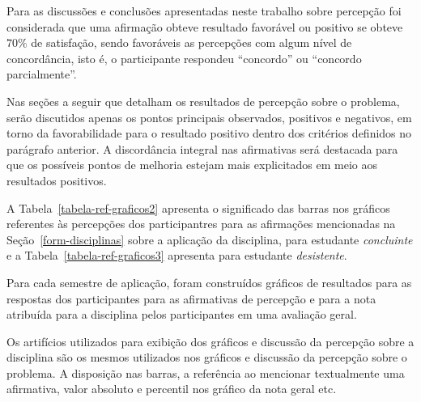 Para as discussões e conclusões apresentadas neste trabalho
sobre percepção foi considerada que uma afirmação obteve
resultado favorável ou positivo
se obteve $70\%$ de satisfação,
sendo favoráveis as percepções com algum nível de concordância,
isto é, o participante respondeu ``concordo''
ou ``concordo parcialmente''.


Nas seções a seguir que detalham os resultados de percepção sobre o problema, 
serão discutidos apenas os pontos principais observados,
positivos e negativos, em torno da favorabilidade para o
resultado positivo dentro dos critérios
definidos no parágrafo anterior.
A discordância integral nas afirmativas será destacada para que
os possíveis pontos de melhoria estejam mais explicitados em meio
aos resultados positivos.


A Tabela~\ref{tabela-ref-graficos2} apresenta
o significado das barras nos gráficos referentes às percepções
dos participantres para as afirmações mencionadas
na Seção~\ref{form-disciplinas} sobre a aplicação da disciplina,
para estudante \textit{concluinte} e
a Tabela~\ref{tabela-ref-graficos3} apresenta
para estudante \textit{desistente}.




Para cada semestre de aplicação, foram construídos gráficos
de resultados para as respostas dos participantes para as afirmativas
de percepção e para a nota atribuída para a disciplina pelos participantes
em uma avaliação geral.

Os artifícios utilizados para exibição dos gráficos e
discussão da percepção sobre a disciplina são os mesmos
utilizados nos gráficos e discussão da percepção sobre
o problema.
A disposição nas barras, a referência ao mencionar textualmente
uma afirmativa, valor absoluto e percentil nos gráfico da
nota geral etc.













